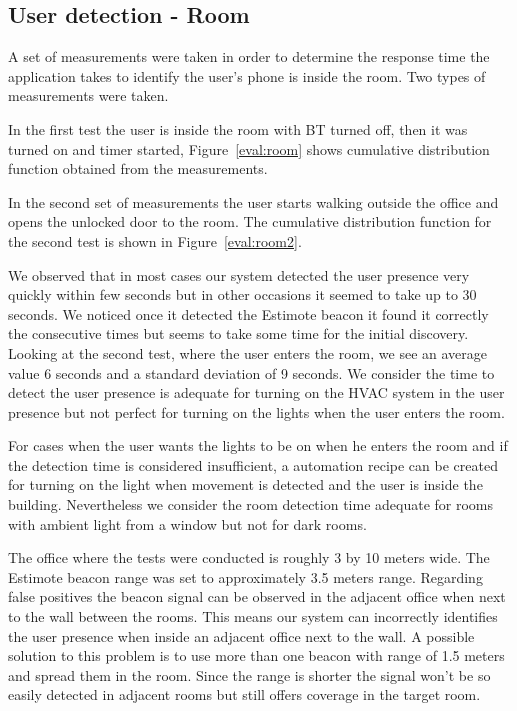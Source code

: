 \subsection{User detection - Room}

A set of measurements were taken in order to determine the response time the application takes to identify the user's phone is inside the room. Two types of measurements were taken.

In the first test the user is inside the room with \ac{BT} turned off, then it was turned on and timer started, Figure~\ref{eval:room} shows cumulative distribution function obtained from the measurements. 

In the second set of measurements the user starts walking outside the office and opens the unlocked door to the room. The cumulative distribution function for the second test is shown in Figure~\ref{eval:room2}.

We observed that in most cases our system detected the user presence very quickly within few seconds but in other occasions it seemed to take up to 30 seconds. We noticed once it detected the Estimote beacon it found it correctly the consecutive times but seems to take some time for the initial discovery. Looking at the second test, where the user enters the room, we see an average value 6 seconds and a standard deviation of 9 seconds. We consider the time to detect the user presence is adequate for turning on the \ac{HVAC} system in the user presence but not perfect for turning on the lights when the user enters the room.

For cases when the user wants the lights to be on when he enters the room and if the detection time is considered insufficient, a automation recipe can be created for turning on the light when movement is detected and the user is inside the building. Nevertheless we consider the room detection time adequate for rooms with ambient light from a window but not for dark rooms.

The office where the tests were conducted is roughly 3 by 10 meters wide. The Estimote beacon range was set to approximately 3.5 meters range. Regarding false positives the beacon signal can be observed in the adjacent office when next to the wall between the rooms. This means our system can incorrectly identifies the user presence when inside an adjacent office next to the wall. A possible solution to this problem is to use more than one beacon with range of 1.5 meters and spread them in the room. Since the range is shorter the signal won't be so easily detected in adjacent rooms but still offers coverage in the target room.


